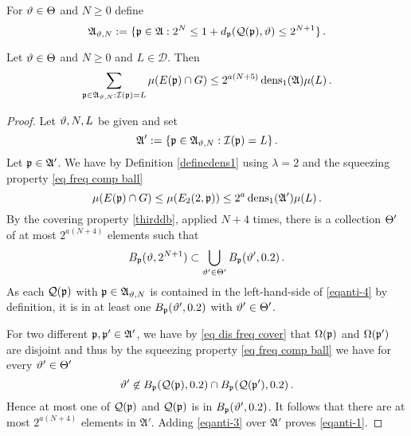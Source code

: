 {For $\vartheta \in \Theta$ and $N\ge 0$ define
\begin{equation}\label{eqantidefap}
    \mathfrak{A}_{\vartheta,N}:=\{\mathfrak p\in\mathfrak{A}: 2^{N}\le 1+d_{\mathfrak p}(\mathcal{Q}(\mathfrak p), \vartheta)\le 2^{N+1}\} \, .
\end{equation}


\begin{lemma}\label{lem samel}
Let $\vartheta \in \Theta$ and $N\ge 0$ and
$L\in \mathcal{D}$. Then
\begin{equation}\label{eqanti-1}
    \sum_{\mathfrak p\in\mathfrak{A}_{\vartheta,N}:\mathcal{I}(\mathfrak p)=L}\mu(E(\mathfrak p)\cap G)\le  2^{a(N+5)}\operatorname{\operatorname{dens}}_1(\mathfrak{A})\mu(L)\, .
\end{equation}
\end{lemma}
\begin{proof}
Let $\vartheta,N,L$ be given and set
\begin{equation}
\mathfrak{A}':=\{\mathfrak p\in\mathfrak{A}_{\vartheta,N}:\mathcal{I}(\mathfrak p)=L\}\, .
\end{equation}
Let
$\mathfrak p\in\mathfrak{A}'$.
We have
by Definition \eqref{definedens1}
using $\lambda=2$ and the squeezing property \eqref{eq freq comp ball}
\begin{equation}\label{eqanti-3}
\mu(E(\mathfrak p)\cap G)\le \mu(E_2(2, \mathfrak p))\le 2^{a}\operatorname{\operatorname{dens}}_1(\mathfrak{A}')\mu(L)\, .
\end{equation}
By the covering property \eqref{thirddb}, applied $N+4$ times, there is a collection $\Theta'$ of at most $2^{a(N+4)}$
elements such that
\begin{equation}\label{eqanti-4}
    B_{\mathfrak p}(\vartheta, 2^{N+1})\subset \bigcup_{\vartheta'\in \Theta'}
    B_{\mathfrak p}(\vartheta', 0.2)\, .
\end{equation}
As each $\mathcal{Q}(\mathfrak p)$ with $\mathfrak p\in \mathfrak{A}_{\vartheta,N}$
is contained in the left-hand-side
of \eqref{eqanti-4}
by definition, it is in  at least one $B_{\mathfrak p}(\vartheta', 0.2)$
with $\vartheta'\in \Theta'$.


For two different $\mathfrak p,\mathfrak p'\in \mathfrak{A}'$, we have by
\eqref{eq dis freq cover} that
$\Omega(\mathfrak p)$ and $\Omega(\mathfrak p')$ are disjoint and thus by the squeezing property \eqref{eq freq comp ball} we have for every $\vartheta'\in \Theta'$
\begin{equation}
    \vartheta'\not\in B_{\mathfrak p}(\mathcal{Q}(\mathfrak p), 0.2)\cap
B_{\mathfrak p}(\mathcal{Q}(\mathfrak p'), 0.2)\, .
\end{equation}
Hence at most one of $\mathcal{Q}(\mathfrak p)$
and $\mathcal{Q}(\mathfrak p)$ is in
$B_{\mathfrak p}(\vartheta', 0.2)$.
It follows that there are at most $2^{a(N+4)}$ elements in
$\mathfrak{A}'$. Adding \eqref{eqanti-3} over $\mathfrak{A}'$ proves
\eqref{eqanti-1}.



\end{proof}}
